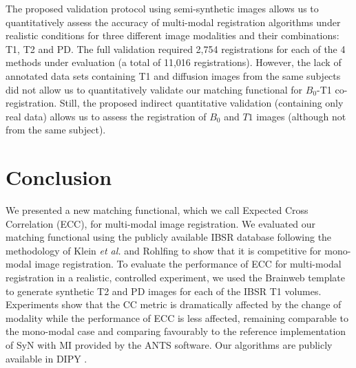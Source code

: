 The proposed validation protocol using semi-synthetic images \cite{Ocegueda2015} allows us to quantitatively assess the accuracy of multi-modal registration algorithms under realistic conditions for three different image modalities and their combinations: T1, T2 and PD. The full validation required 2,754 registrations for each of the 4 methods under evaluation (a total of 11,016 registrations). However, the lack of annotated data sets containing T1 and diffusion images from the same subjects did not allow us to quantitatively validate our matching functional for $B_{0}$-T1 co-registration. Still, the proposed indirect quantitative validation (containing only real data) allows us to assess the registration of $B_{0}$ and $T1$ images (although not from the same subject).

\section{Conclusion}
We presented a new matching functional, which we call Expected Cross Correlation (ECC), for multi-modal image registration. We evaluated our matching functional using the publicly available IBSR database following the methodology of Klein {\it et al.} \cite{Klein2009, Klein2010} and Rohlfing \cite{Rohlfing2012} to show that it is competitive for mono-modal image registration. To evaluate the performance of ECC for multi-modal registration in a realistic, controlled experiment, we used the Brainweb \cite{Cocosco1997, Kwan1999} template to generate synthetic T2 and PD images for each of the IBSR T1 volumes. Experiments show that the CC metric is dramatically affected by the change of modality while the performance of ECC is less affected, remaining comparable to the mono-modal case and comparing favourably to the reference implementation of SyN with MI provided by the ANTS software. Our algorithms are publicly available in DIPY \cite{Garyfallidis2014}.


